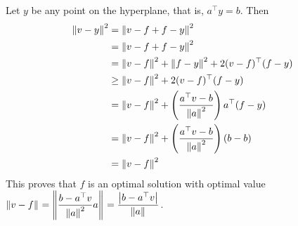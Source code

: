 \begin{enumerate}[leftmargin=*]
Let $y$ be any point on the hyperplane, that is, $a^{\top} y = b$. Then 
\begin{align*}
\left\lVert v-y \right\rVert_{}^{2} &= \left\lVert v-f+f-y \right\rVert_{}^{2}\\
&= \left\lVert v-f+f-y \right\rVert_{}^{2}\\
&= \left\lVert v-f \right\rVert_{}^{2} + \left\lVert f-y \right\rVert_{}^{2} + 2(v-f)^{\top}(f-y)\\
&\ge \left\lVert v-f \right\rVert_{}^{2} + 2(v-f)^{\top}(f-y)\\
&= \left\lVert v-f \right\rVert_{}^{2} + \left(\frac{a^{\top}v-b}{\left\lVert a \right\rVert_{}^{2}}\right)a^{\top}(f-y)\\
&= \left\lVert v-f \right\rVert_{}^{2} + \left(\frac{a^{\top}v-b}{\left\lVert a \right\rVert_{}^{2}}\right)(b-b)\\
&= \left\lVert v-f \right\rVert_{}^{2}
\end{align*}
This proves that $f$ is an optimal solution with optimal value $\displaystyle\left\lVert v-f \right\rVert_{} = \left\lVert \frac{b-a^{\top}v}{\left\lVert a \right\rVert_{}^{2}}a \right\rVert_{} = \frac{\left| b-a^{\top}v \right|}{\left\lVert a \right\rVert_{}}$.
\end{enumerate}









\newpage

\pb

